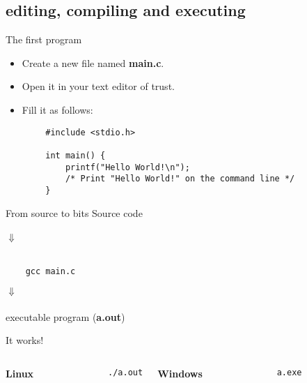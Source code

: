 \subsection{editing, compiling and executing}
\begin{frame}[fragile]{The first program}
	\begin{itemize}
		\item Create a new file named \textbf{main.c}.
		\item Open it in your text editor of trust.
		\item Fill it as follows:
	\end{itemize}
	\begin{lstlisting}
		#include <stdio.h>
		
		int main() {
		    printf("Hello World!\n");
		    /* Print "Hello World!" on the command line */
		}
	\end{lstlisting}
\end{frame}
\begin{frame}[fragile]{From source to bits}
	\centering
	Source code\\\ \\
	$\Downarrow$\\\ \\
	\begin{lstlisting}
	gcc main.c
	\end{lstlisting}
	$\Downarrow$\\\ \\
	executable program (\textbf{a.out})\\
\end{frame}
\begin{frame}[fragile]{It works!}
	\begin{columns}[T]
		\textbf{Linux}\\
		\begin{lstlisting}
			./a.out
		\end{lstlisting}
		\textbf{Windows}\\
		\begin{lstlisting}
			a.exe
		\end{lstlisting}
	\end{columns}
\end{frame}

